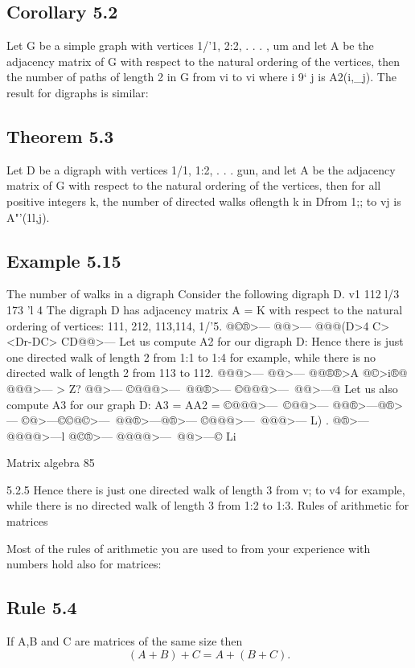﻿\documentclass{beamer}
\begin{document}
{%
\subsection{Corollary 5.2} Let G be a simple graph with vertices 1/'1, 2:2, . . . , um and
let A be the adjacency matrix of G with respect to the natural ordering
of the vertices, then the number of paths of length 2 in G from vi to vi
where i 9‘ j is A2(i,_j).
The result for digraphs is similar:
\subsection{Theorem 5.3} Let D be a digraph with vertices 1/1, 1:2, . . . gun, and let A
be the adjacency matrix of G with respect to the natural ordering of
the vertices, then for all positive integers k, the number of directed
walks oflength k in Dfrom 1;; to vj is A"'(1l,j).
\subsection{Example 5.15} The number of walks in a digraph
Consider the following digraph D.
v1 112
l/3
173 ’l 4
The digraph D has adjacency matrix
A = K
with respect to the natural ordering of vertices: 111, 212, 113,114, 1/'5.
@©®>—\@
@@>—\@@
@@@(D>4
C><Dr-\<DC>
CD@@>—\Q
Let us compute A2 for our digraph D:
Hence there is just one directed walk of length 2 from 1:1 to 1:4 for
example, while there is no directed walk of length 2 from 113 to 112.
@@@>—\@
@@>—\@@
@@®®>A
@©>i®@
@@@>—\@
 >
Z?
@@>—\@@
©@@@>—\
@@®>—\@
©@@@>—\
@@>—\®@
Let us also compute A3 for our graph D:
A3 = AA2 =
©@@@>—@@>—\©
@@®>—®>—\@@
©@>—\@@ ©©@©>—\
@@®>—\@ @®>—\@@
©@@@>—@>—\@
L)
.
@®>—\@@
@@@@>—l
@©®>—\@
@@@@>—\
@@>—\@©
Li}
Matrix algebra
85



5.2.5
Hence there is just one directed walk of length 3 from v; to v4 for
example, while there is no directed walk of length 3 from 1:2 to 1:3.
Rules of arithmetic for matrices

Most of the rules of arithmetic you are used to from your experience
with numbers hold also for matrices:

\subsection{Rule 5.4} If A,B and C are matrices of the same size then
\[(A+B)+C=A+(B+C).\]
\end{document}
